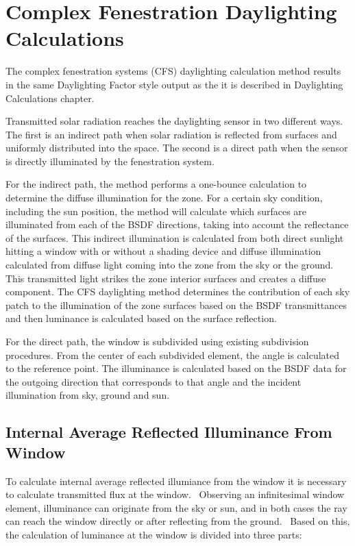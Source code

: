 \section{Complex Fenestration Daylighting Calculations}\label{complex-fenestration-daylighting-calculations}

The complex fenestration systems (CFS) daylighting calculation method results in the same Daylighting Factor style output as the it is described in Daylighting Calculations chapter.

Transmitted solar radiation reaches the daylighting sensor in two different ways. The first is an indirect path when solar radiation is reflected from surfaces and uniformly distributed into the space. The second is a direct path when the sensor is directly illuminated by the fenestration system.

For the indirect path, the method performs a one-bounce calculation to determine the diffuse illumination for the zone. For a certain sky condition, including the sun position, the method will calculate which surfaces are illuminated from each of the BSDF directions, taking into account the reflectance of the surfaces. This indirect illumination is calculated from both direct sunlight hitting a window with or without a shading device and diffuse illumination calculated from diffuse light coming into the zone from the sky or the ground. This transmitted light strikes the zone interior surfaces and creates a diffuse component. The CFS daylighting method determines the contribution of each sky patch to the illumination of the zone surfaces based on the BSDF transmittances and then luminance is calculated based on the surface reflection.

For the direct path, the window is subdivided using existing subdivision procedures. From the center of each subdivided element, the angle is calculated to the reference point. The illuminance is calculated based on the BSDF data for the outgoing direction that corresponds to that angle and the incident illumination from sky, ground and sun.

\subsection{Internal Average Reflected Illuminance From Window}\label{internal-average-reflected-illuminance-from-window}

To calculate internal average reflected illumiance from the window it is necessary to calculate transmitted flux at the window.~ Observing an infinitesimal window element, illuminance can originate from the sky or sun, and in both cases the ray can reach the window directly or after reflecting from the ground.~ Based on this, the calculation of luminance at the window is divided into three parts:

